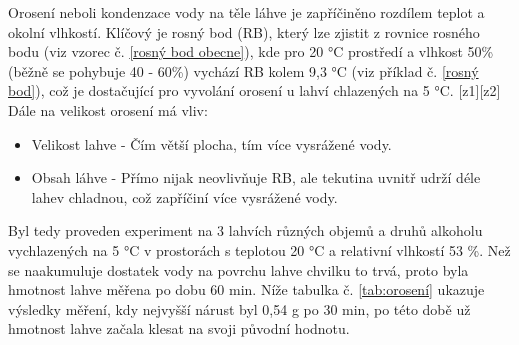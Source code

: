 Orosení neboli kondenzace vody na těle láhve je zapříčiněno rozdílem teplot a okolní vlhkostí. Klíčový je rosný bod (RB), který lze zjistit z rovnice rosného bodu (viz vzorec č. \ref{rosný bod obecne}), kde pro 20 °C prostředí a vlhkost 50\% (běžně se pohybuje 40 - 60\%) vychází RB kolem 9,3 °C (viz příklad č. \ref{rosný bod}), což je dostačující pro vyvolání orosení u lahví chlazených na 5 °C. [z1][z2]
Dále na velikost orosení má vliv:
\begin{itemize}
    \item Velikost lahve - Čím větší plocha, tím více vysrážené vody.
    \item Obsah láhve - Přímo nijak neovlivňuje RB, ale tekutina uvnitř udrží déle lahev chladnou, což zapříčiní více vysrážené vody.
\end{itemize}
\smallskip
Byl tedy proveden experiment na 3 lahvích různých objemů a druhů alkoholu vychlazených na 5 °C v prostorách s teplotou 20 °C a relativní vlhkostí 53 \%. Než se naakumuluje dostatek vody na povrchu lahve chvilku to trvá, proto byla hmotnost lahve měřena po dobu 60 min. Níže tabulka č. \ref{tab:orosení} ukazuje výsledky měření, kdy nejvyšší nárust byl 0,54 g po 30 min, po této době už hmotnost lahve začala klesat na svoji původní hodnotu.



